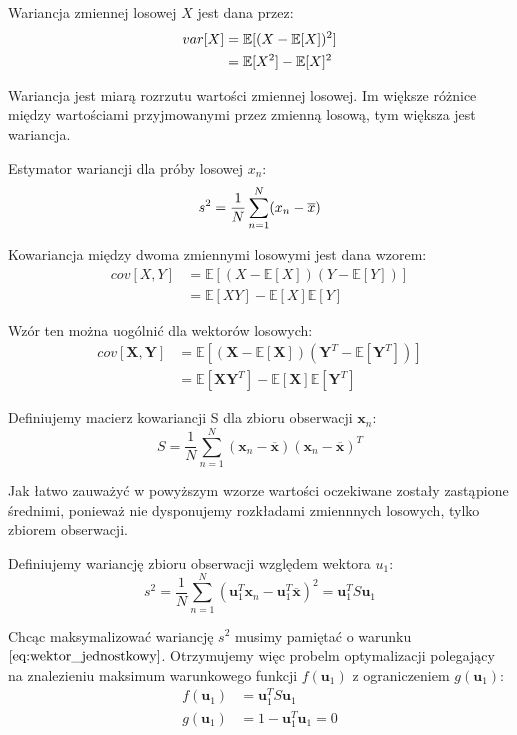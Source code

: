 \documentclass[oneside, eng]{mgr}
\newcommand{\bb}{\textbf}
\begin{document}
Wariancja zmiennej losowej $X$ jest dana przez:
\begin{align*}	\notag
	var[X]  &= \mathbb{E}[(X - \mathbb{E}[X])^2] \\
			&= \mathbb{E}[X^2] - \mathbb{E}[X]^2
\end{align*}

Wariancja jest miarą rozrzutu wartości zmiennej losowej. Im większe różnice między wartościami przyjmowanymi przez zmienną losową, tym większa jest wariancja.

Estymator wariancji dla próby losowej $x_n$:
\begin{equation}	\notag
	s^2 = \frac{1}{N} \sum_{n=1}^{N}(x_n - \overline{x})
\end{equation}

Kowariancja między dwoma zmiennymi losowymi jest dana wzorem:
\begin{align}	
	cov[X,Y] &= \mathbb{E}[(X - \mathbb{E}[X])(Y - \mathbb{E}[Y])]  \label{eq:cov} \\ 
			 &= \mathbb{E}[XY] - \mathbb{E}[X]\mathbb{E}[Y] \nonumber
\end{align}

Wzór ten można uogólnić dla wektorów losowych:
\begin{align*}
	cov[\textbf{X}, \bb{Y}] &= \mathbb{E}[(\bb{X} - \mathbb{E}[\bb{X}])(\bb{Y}^T - \mathbb{E}[\bb{Y}^T])] \\
							&= \mathbb{E}[\bb{X}\bb{Y}^T] - \mathbb{E}[\bb{X}]\mathbb{E}[\bb{Y}^T]
\end{align*}

Definiujemy macierz kowariancji S dla zbioru obserwacji $\bb{x}_n$:
\begin{equation}
	S = \frac{1}{N} \sum_{n=1}^{N} (\bb{x}_n - \overline{\bb{x}})(\bb{x}_n - \overline{\bb{x}})^T
\end{equation}

Jak łatwo zauważyć w powyższym wzorze wartości oczekiwane zostały zastąpione średnimi, ponieważ nie dysponujemy rozkładami zmiennnych losowych, tylko zbiorem obserwacji.

Definiujemy wariancję zbioru obserwacji względem wektora $u_1$:
\begin{equation}
	s^2 = \frac{1}{N} \sum_{n=1}^{N}(\bb{u}_1^T \bb{x}_n - \bb{u}_1^T\overline{\bb{x}})^2 = \bb{u}_1^T S \bb{u}_1
\end{equation}

Chcąc maksymalizować wariancję $s^2$ musimy pamiętać o warunku $\ref{eq:wektor_jednostkowy}$. Otrzymujemy więc probelm optymalizacji polegający na znalezieniu maksimum warunkowego funkcji $f(\bb{u}_1)$ z ograniczeniem $g(\bb{u}_1)$:
\begin{align*}
	f(\bb{u}_1) &= \bb{u}_1^T S \bb{u}_1 \\
	g(\bb{u}_1) &= 1 - \bb{u}_1^T \bb{u}_1 = 0
\end{align*}
\end{document}
